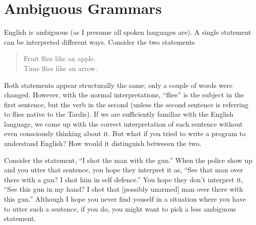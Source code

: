 \documentclass[letterpaper,12pt,openany,reqno]{book}%
\begin{document}
\section{Ambiguous Grammars}\label{S.ambiguous.grammars}
English is ambiguous (as I presume all spoken languages are). A single statement can be interpreted different ways. Consider the two statements
\begin{quote}
Fruit flies like an apple.\\
Time flies like an arrow.
\end{quote}
Both statements appear structurally the same; only a couple of words were changed. However, with the normal interpretations, ``flies'' is the subject in the first sentence, but the verb in the second (unless the second sentence is referring to flies native to the Tardis). If we are sufficiently familiar with the English language, we come up with the correct interpretation of each sentence without even consciously thinking about it. But what if you tried to write a program to understand English? How would it distinguish betweeen the two.

Consider the statement, ``I shot the man with the gun.'' When the police show up and you utter that sentence, you hope they interpret it as, ``See that man over there with a gun? I shot him in self defence.'' You hope they don't interpret it, ``See this gun in my hand? I shot that [possibly unarmed] man over there with this gun.'' Although I hope you never find youself in a situation where you have to utter such a sentence, if you do, you might want to pick a less ambiguous statement.
\end{document}
